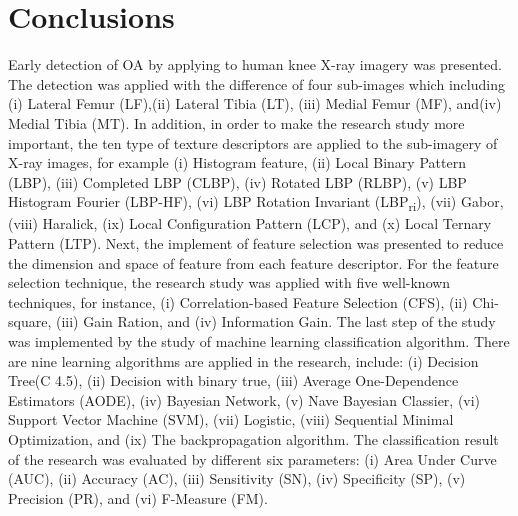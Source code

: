 \documentclass[review]{elsarticle}
\begin{document}

\section{Conclusions}

Early detection of OA by applying to human knee X-ray imagery was presented. The detection was applied with the difference of four sub-images which including (i) Lateral Femur (LF),(ii) Lateral Tibia (LT), (iii) Medial Femur (MF), and(iv) Medial Tibia (MT). In addition, in order to make the research study more important, the ten type of texture descriptors are applied to the sub-imagery of X-ray images, for example (i) Histogram feature, (ii) Local Binary Pattern (LBP), (iii) Completed LBP (CLBP), (iv) Rotated
LBP (RLBP), (v) LBP Histogram Fourier (LBP-HF), (vi) LBP Rotation Invariant (LBP\textsubscript{ri}), (vii) Gabor, (viii) Haralick, (ix) Local Conﬁguration Pattern (LCP),
and (x) Local Ternary Pattern (LTP). Next, the implement of feature selection was presented to reduce the dimension and space of feature from each feature descriptor. For the feature selection technique, the research study was applied with five well-known techniques, for instance, (i) Correlation-based Feature Selection (CFS), (ii) Chi-square, (iii) Gain
Ration, and (iv) Information Gain. The last step of the study was implemented by the study of machine learning classification algorithm. There are nine learning algorithms are applied in the research, include:  (i) Decision Tree(C 4.5), (ii) Decision with binary true, (iii) Average One-Dependence Estimators (AODE), (iv) Bayesian Network, (v) Nave Bayesian Classier, (vi) Support Vector Machine (SVM), (vii) Logistic, (viii) Sequential Minimal Optimization,
and (ix) The backpropagation algorithm. The classification result of the research was evaluated by different six parameters: (i) Area Under Curve (AUC), (ii) Accuracy (AC),
(iii) Sensitivity (SN), (iv) Specificity (SP), (v) Precision (PR), and (vi) F-Measure (FM).
\end{document}
